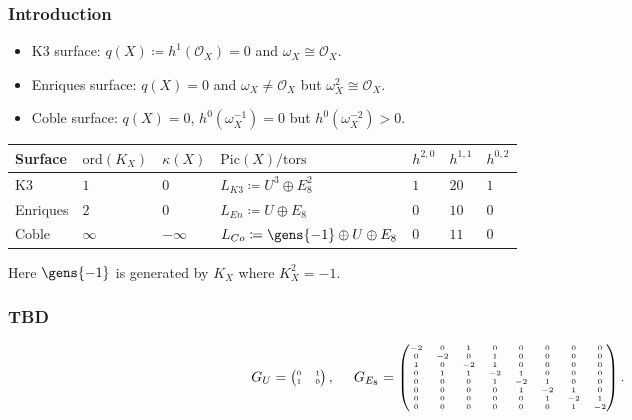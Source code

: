 \documentclass{beamer}
\begin{document}
{\begin{frame}
\frametitle{Introduction}
\begin{itemize}
\item K3 surface: \quad\hspace{0.6em} $q(X) \coloneqq h^1(\mathcal{O}_X) = 0$ and $\omega_X \cong \mathcal{O}_X$.
\item Enriques surface:  $q(X) = 0$ and $\omega_X \neq \mathcal{O}_X$ but $\omega_X^2 \cong \mathcal{O}_X$.
\item Coble surface: \hspace{1em} $q(X) = 0$, $h^0(\omega_X^{-1}) = 0$ but $h^0(\omega_X^{-2}) > 0$.
\end{itemize}
\vspace{1em}
\begin{centering}
{
\small
\begin{tabular}{l|llllll}
	Surface 	& $\mathrm{ord}(K_X)$ & $\kappa(X)$ 	& $\mathrm{Pic}(X)/\mathrm{tors}$ & $h^{2, 0}$ 
		& $h^{1,1}$ & $h^{0, 2}$ \\ \hline
	K3 			& $1$ & $0$ 			& $L_{K3} \coloneqq U^3 \oplus E_8^2$ 
		& $1$ & $20$ & $1$ \\
	Enriques 	& $2$ & $0$ 			& $L_{En} \coloneqq U \oplus E_8$ 
		& $0$ & $10$ & $0$ \\
	Coble 		& $\infty$ & $-\infty$ 		& $L_{Co} \coloneqq \gens{-1} \oplus U \oplus E_8$
		& $0$ & $11$ & $0$ \\
\end{tabular}
}
\end{centering}
\newline
{\small
\newline
Here $\gens{-1}$ is generated by $K_X$ where $K_X^2 = -1$.
}
\end{frame}
\begin{frame}\frametitle{TBD}
{
\[
\tiny 
G_U = \begin{pmatrix} 0 & 1 \\ 1 & 0 \end{pmatrix}, \qquad
G_{E_8}
=
\begin{pmatrix}
 -2 &  0 & 1 &  0 &  0 &  0 &  0 &  0 \\
 0 &  -2 &  0 & 1 &  0 &  0 &  0 &  0 \\
1 &  0 &  -2 & 1 &  0 &  0 &  0 &  0 \\
 0 & 1 & 1 &  -2 & 1 &  0 &  0 &  0 \\
 0 &  0 &  0 & 1 &  -2 & 1 &  0 &  0 \\
 0 &  0 &  0 &  0 & 1 &  -2 & 1 &  0 \\
 0 &  0 &  0 &  0 &  0 & 1 &  -2 & 1 \\
 0 &  0 &  0 &  0 &  0 &  0 & 1 &  -2
\end{pmatrix}.
\]
}


\end{frame}}
\end{document}
